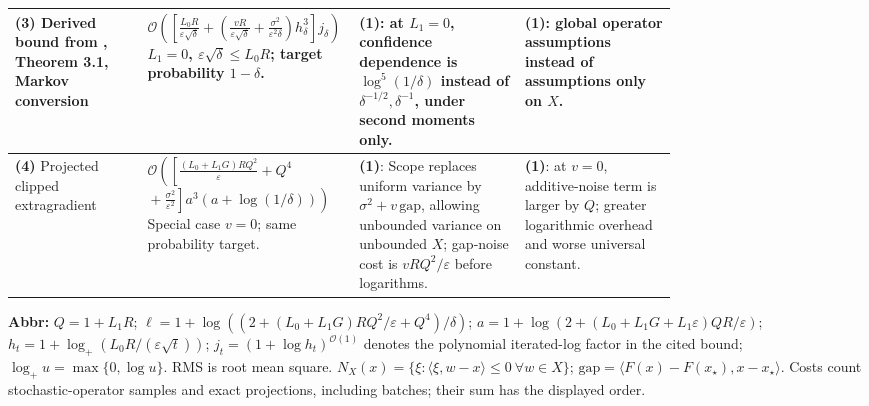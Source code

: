\begin{table}[tp]
\begin{threeparttable}
\begin{tabularx}{\linewidth}{@{}>{\raggedright\arraybackslash}p{0.20\linewidth}>{\raggedright\arraybackslash}p{0.32\linewidth}>{\raggedright\arraybackslash}p{0.25\linewidth}>{\raggedright\arraybackslash}X@{}}
\midrule
\textbf{(3)} Derived bound from \citep{gnJiLanZhuV2}, Theorem 3.1, Markov conversion & $\mathcal{O}\!\left(\left[\frac{L_0R}{\varepsilon\sqrt\delta}+\left(\frac{vR}{\varepsilon\sqrt\delta}+\frac{\sigma^2}{\varepsilon^2\delta}\right)h_\delta^3\right]j_\delta\right)$\newline $L_1=0$, $\varepsilon\sqrt\delta\le L_0R$; target probability $1-\delta$. & \textbf{(1)}: at $L_1=0$, confidence dependence is $\log^5(1/\delta)$ instead of $\delta^{-1/2},\delta^{-1}$, under second moments only. & \textbf{(1)}: global operator assumptions instead of assumptions only on $X$. \\
\midrule
\textbf{(4)} Projected clipped extragradient \citep{gnRepository2026} & $\mathcal{O}\!\left(\left[\frac{(L_0+L_1G)RQ^2}{\varepsilon}+Q^4\right.\right.$\newline $\left.\left.{}+\frac{\sigma^2}{\varepsilon^2}\right]a^3(a+\log(1/\delta))\right)$\newline Special case $v=0$; same probability target. & \textbf{(1)}: Scope replaces uniform variance by $\sigma^2+v\,\mathrm{gap}$, allowing unbounded variance on unbounded $X$; gap-noise cost is $vRQ^2/\varepsilon$ before logarithms. & \textbf{(1)}: at $v=0$, additive-noise term is larger by $Q$; greater logarithmic overhead and worse universal constant. \\
\bottomrule
\end{tabularx}
\begin{tablenotes}[flushleft]\footnotesize
\item[] \textbf{Abbr:} $Q=1+L_1R$; $\ell=1+\log((2+(L_0+L_1G)RQ^2/\varepsilon+Q^4)/\delta)$; $a=1+\log(2+(L_0+L_1G+L_1\varepsilon)QR/\varepsilon)$; $h_t=1+\log_+(L_0R/(\varepsilon\sqrt t))$; $j_t=(1+\log h_t)^{\mathcal{O}(1)}$ denotes the polynomial iterated-log factor in the cited bound; $\log_+u=\max\{0,\log u\}$. RMS is root mean square. $N_X(x)=\{\xi:\langle\xi,w-x\rangle\le0\ \forall w\in X\}$; $\mathrm{gap}=\langle F(x)-F(x_\star),x-x_\star\rangle$. Costs count stochastic-operator samples and exact projections, including batches; their sum has the displayed order.
\end{tablenotes}
\end{threeparttable}
\end{table}
\clearpage
